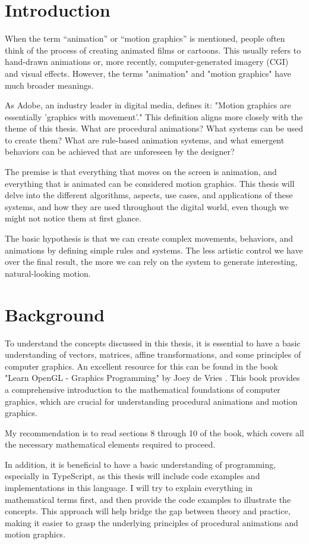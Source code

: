 \section{Introduction}
\label{sec:intro}

When the term ``animation'' or ``motion graphics'' is mentioned, people often think of the process of creating animated films or cartoons. This usually refers to hand-drawn animations or, more recently, computer-generated imagery (CGI) and visual effects. However, the terms "animation" and "motion graphics" have much broader meanings.

As Adobe, an industry leader in digital media, defines it: "Motion graphics are essentially 'graphics with movement'." \cite{adobe-motion-graphics} This definition aligns more closely with the theme of this thesis. What are procedural animations? What systems can be used to create them? What are rule-based animation systems, and what emergent behaviors can be achieved that are unforeseen by the designer?

The premise is that everything that moves on the screen is animation, and everything that is animated can be considered motion graphics. This thesis will delve into the different algorithms, aspects, use cases, and applications of these systems, and how they are used throughout the digital world, even though we might not notice them at first glance.

The basic hypothesis is that we can create complex movements, behaviors, and animations by defining simple rules and systems. The less artistic control we have over the final result, the more we can rely on the system to generate interesting, natural-looking motion.

\section{Background}
\label{sec:background}

To understand the concepts discussed in this thesis, it is essential to have a basic understanding of vectors, matrices, affine transformations, and some principles of computer graphics. An excellent resource for this can be found in the book "Learn OpenGL - Graphics Programming" by Joey de Vries \cite{learn-opengl}. This book provides a comprehensive introduction to the mathematical foundations of computer graphics, which are crucial for understanding procedural animations and motion graphics.

My recommendation is to read sections 8 through 10 of the book, which covers all the necessary mathematical elements required to proceed.

In addition, it is beneficial to have a basic understanding of programming, especially in TypeScript, as this thesis will include code examples and implementations in this language. I will try to explain everything in mathematical terms first, and then provide the code examples to illustrate the concepts. This approach will help bridge the gap between theory and practice, making it easier to grasp the underlying principles of procedural animations and motion graphics.

